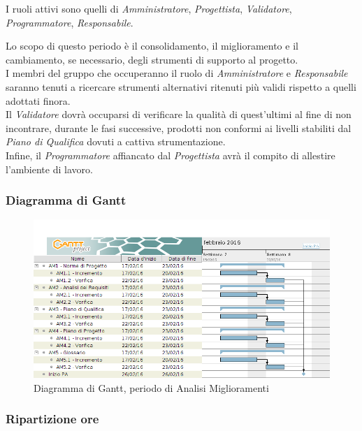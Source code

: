 I ruoli attivi sono quelli di \textit{Amministratore}, \textit{Progettista}, \textit{Validatore}, \textit{Programmatore}, \textit{Responsabile}.


Lo scopo di questo periodo \`e il consolidamento, il miglioramento e il cambiamento, se necessario, degli strumenti di supporto al progetto.\\
I membri del gruppo che occuperanno il ruolo di \textit{Amministratore} e \textit{Responsabile} saranno tenuti a ricercare strumenti alternativi ritenuti pi\`u validi rispetto a quelli adottati finora.\\
Il \textit{Validatore} dovr\`a occuparsi di verificare la qualit\`a di quest'ultimi al fine di non incontrare, durante le fasi successive, prodotti non conformi ai livelli stabiliti dal \textit{Piano di Qualifica} dovuti a cattiva strumentazione.\\
Infine, il \textit{Programmatore} affiancato dal \textit{Progettista} avr\`a il compito di allestire l'ambiente di lavoro.

\subsubsection{Diagramma di Gantt}
\begin{figure}[ht!]
\includegraphics[width=1\textwidth]{res/img/pianificazione/AnalisiMiglioramenti.png}
\caption{Diagramma di Gantt, periodo di Analisi Miglioramenti}
\end{figure}


\subsubsection{Ripartizione ore}


